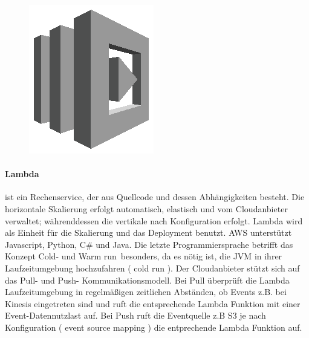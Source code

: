 \documentclass[
12pt,
english,
ngerman,
headsepline,
twoside,
openright,
numbers=noenddot,version=first
]{scrreprt}
\begin{document}
\begin{figure}
	\includegraphics[width=0.9\linewidth]{./pics/aws/Compute_GRAYSCALE_AWSLambda.eps}
\end{figure}
\paragraph{Lambda}\label{par:lambda} ist ein Rechenservice, der aus Quellcode und dessen Abhängigkeiten besteht. Die horizontale Skalierung erfolgt automatisch, elastisch und vom Cloudanbieter verwaltet; währenddessen die vertikale nach Konfiguration erfolgt. Lambda wird als Einheit für die Skalierung und das Deployment benutzt. \acrshort{AWS} unterstützt Javascript, Python, C\# und Java. Die letzte Programmiersprache betrifft das Konzept \glqq Cold- und Warm\label{lambda-cold-warm} run\grqq\ besonders, da es nötig ist, die \acrfull{JVM} in ihrer Laufzeitumgebung hochzufahren ( cold run ). Der Cloudanbieter stützt sich auf das Pull- und Push- Kommunikationsmodell. Bei Pull überprüft die Lambda Laufzeitumgebung in regelmäßigen zeitlichen Abständen, ob Events z.B. bei Kinesis eingetreten sind und ruft die entsprechende Lambda Funktion mit einer Event-Datennutzlast auf. Bei Push ruft die Eventquelle z.B S3 je nach Konfiguration ( event source mapping ) die entprechende Lambda Funktion auf. 
\end{document}
